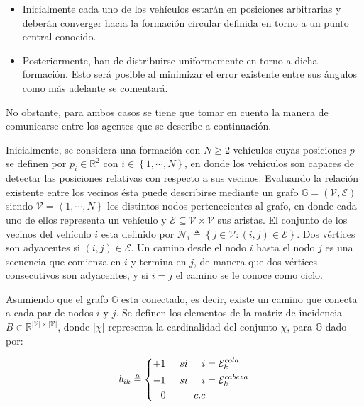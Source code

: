 \begin{itemize}
	\item Inicialmente cada uno de los vehículos estarán en posiciones arbitrarias y deberán converger hacia la formación circular definida en torno a un punto central conocido.
	\item Posteriormente, han de distribuirse uniformemente en torno a dicha formación. Esto será posible al minimizar el error existente entre sus ángulos como más adelante se comentará.
\end{itemize}

No obstante, para ambos casos se tiene que tomar en cuenta la manera de comunicarse entre los agentes que se describe a continuación. 

Inicialmente, se considera una formación con $N\geq{2}$ vehículos cuyas posiciones $p$ se definen por $p_i\in\mathbb{R}^2$ con $i\in\left\lbrace{1,\cdots,N}\right\rbrace$, en donde los vehículos son capaces de detectar las posiciones relativas con respecto a sus vecinos. Evaluando la relación existente entre los vecinos ésta puede describirse mediante un grafo $\mathbb{G}=\left(\mathcal{V},\mathcal{E}\right)$ siendo $\mathcal{V}=\left\langle{1,\cdots,N}\right\rbrace$ los distintos nodos pertenecientes al grafo, en donde cada uno de ellos representa un vehículo y $\mathcal{E}\subseteq\mathcal{V}\times\mathcal{V}$ sus aristas. El conjunto de los vecinos del vehículo $i$ esta definido por $\mathcal{N}_i\triangleq\left\lbrace{j\in\mathcal{V}:\left(i,j\right)\in\mathcal{E}}\right\rbrace$. Dos vértices son adyacentes si $\left(i,j\right)\in\mathcal{E}$. Un camino desde el nodo $i$ hasta el nodo $j$ es una secuencia que comienza en $i$ y termina en $j$, de manera que dos vértices consecutivos son adyacentes, y si $i=j$ el camino se le conoce como ciclo. \cite{Control_Formacion}

Asumiendo que el grafo $\mathbb{G}$ esta conectado, es decir, existe un camino que conecta a cada par de nodos $i$ y $j$. Se definen los elementos de la matriz de incidencia $B\in\mathbb{R}^{|\mathcal{V}|\times|\mathcal{V}|}$, donde $|\chi|$ representa la cardinalidad del conjunto $\chi$, para $\mathbb{G}$ dado por:

\begin{equation} \label{Incidence}
  b_{ik}\triangleq\left \{
    \begin{aligned}
+1\hspace{5mm}si\hspace{5mm}i&=\mathcal{E}^{cola}_{k}\\
-1\hspace{5mm}si\hspace{5mm}i&=\mathcal{E}^{cabeza}_{k}\\
0\hspace{10mm}c.c\\
    \end{aligned}
  \right .
\end{equation}

